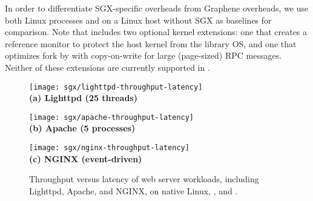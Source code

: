 In order to differentiate SGX-specific overheads 
from Graphene overheads,
we use both
Linux processes and \graphene{} on a Linux host without SGX as baselines
for comparison.
Note that \graphene{} includes two optional kernel extensions:
one that creates a reference monitor to protect the host kernel from 
the library OS, and one that optimizes fork by 
with copy-on-write for large (page-sized) RPC messages.
Neither of these extensions are currently supported in \graphenesgx{}.

\begin{figure*}[t!]
\centering

\begin{minipage}{.3\textwidth}
\centering
\texttt{[image: sgx/lighttpd-throughput-latency]}\\
{\bf (a) Lighttpd (25 threads)}
\end{minipage}
\begin{minipage}{.3\textwidth}
\centering
\texttt{[image: sgx/apache-throughput-latency]}\\
{\bf (b) Apache (5 processes)}
\end{minipage}
\begin{minipage}{.3\textwidth}
\centering
\texttt{[image: sgx/nginx-throughput-latency]}\\
{\bf (c) NGINX (event-driven)}
\end{minipage}

\caption{Throughput versus latency of web server workloads, including Lighttpd, Apache, and NGINX, on native Linux, \graphene{}, and \graphenesgx{}.}
\label{fig:server-throughput-latency}
\end{figure*}


